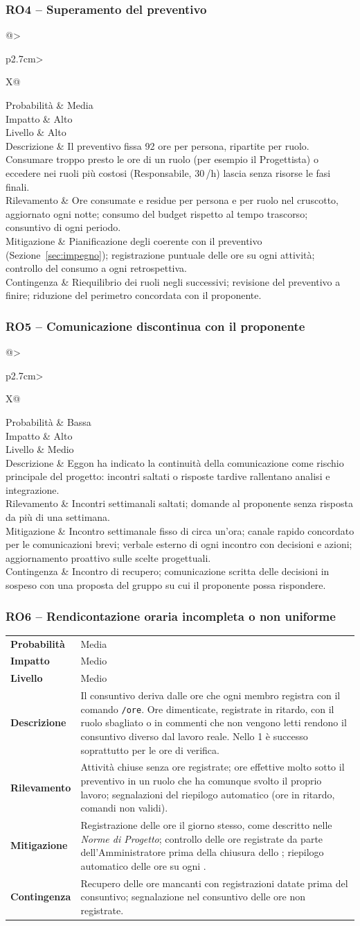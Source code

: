 \documentclass[documento]{gpt}
\makeatletter
\newcommand{\rischio}[9]{%
  \subsubsection{#1 -- #2}\label{rischio:#1}
  \noindent
  \begin{tabularx}{\linewidth}{@{}>{\raggedright\arraybackslash\bfseries}p{2.7cm}>{\raggedright\arraybackslash}X@{}}
    \toprule
    Probabilità & #3 \\
    Impatto     & #4 \\
    Livello     & #5 \\
    \midrule
    Descrizione & #6 \\
    \addlinespace
    Rilevamento & #7 \\
    \addlinespace
    Mitigazione & #8 \\
    \addlinespace
    Contingenza & #9 \\
    \bottomrule
  \end{tabularx}
  \medskip
}
\makeatother
\begin{document}
\rischio{RO4}{Superamento del preventivo}{Media}{Alto}{Alto}
{Il preventivo fissa 92 ore per persona, ripartite per ruolo. Consumare
 troppo presto le ore di un ruolo (per esempio il Progettista) o
 eccedere nei ruoli più costosi (Responsabile, 30\,\texteuro/h) lascia
 senza risorse le fasi finali.}
{Ore consumate e residue per persona e per ruolo nel cruscotto, aggiornato
 ogni notte; consumo del budget rispetto al tempo trascorso; consuntivo di
 ogni periodo.}
{Pianificazione degli \glo[Sprint]{\textit{sprint}} coerente con il preventivo
 (Sezione~\ref{sec:impegno}); registrazione puntuale delle ore su ogni
 attività; controllo del consumo a ogni retrospettiva.}
{Riequilibrio dei ruoli negli \glo[Sprint]{\textit{sprint}} successivi; revisione del
 preventivo a finire; riduzione del perimetro concordata con il
 proponente.}

\rischio{RO5}{Comunicazione discontinua con il proponente}{Bassa}{Alto}{Medio}
{Eggon ha indicato la continuità della comunicazione come rischio
 principale del progetto: incontri saltati o risposte tardive rallentano
 analisi e integrazione.}
{Incontri settimanali saltati; domande al proponente senza risposta da
 più di una settimana.}
{Incontro settimanale fisso di circa un'ora; canale rapido concordato per le comunicazioni brevi; verbale
 esterno di ogni incontro con decisioni e azioni; aggiornamento proattivo
 sulle scelte progettuali.}
{Incontro di recupero; comunicazione scritta delle decisioni in sospeso
 con una proposta del gruppo su cui il proponente possa rispondere.}

\rischio{RO6}{Rendicontazione oraria incompleta o non uniforme}{Media}{Medio}{Medio}
{Il consuntivo deriva dalle ore che ogni membro registra con il comando
 \texttt{/ore}. Ore dimenticate, registrate in ritardo, con il ruolo
 sbagliato o in commenti che non vengono letti rendono il consuntivo
 diverso dal lavoro reale. Nello \glo[Sprint]{\textit{sprint}} 1 è successo
 soprattutto per le ore di verifica.}
{Attività chiuse senza ore registrate; ore effettive molto sotto il
 preventivo in un ruolo che ha comunque svolto il proprio lavoro;
 segnalazioni del riepilogo automatico (ore in ritardo, comandi non
 validi).}
{Registrazione delle ore il giorno stesso, come descritto nelle
 \textit{Norme di Progetto}; controllo delle ore registrate da parte
 dell'Amministratore prima della chiusura dello \glo[Sprint]{\textit{sprint}};
 riepilogo automatico delle ore su ogni \glo[Issue]{\textit{issue}}.}
{Recupero delle ore mancanti con registrazioni datate prima del
 consuntivo; segnalazione nel consuntivo delle ore non registrate.}
\end{document}

